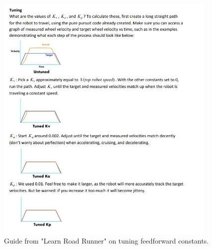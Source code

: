 \begin{figure}[htp]
\centering
\includegraphics[width=0.95\textwidth, angle=0]{Meetings/March/03-24-22/03-24-22 3.jpg}
\caption{Guide from "Learn Road Runner" on tuning feedforward constants.}
\label{fig:032422_3}
\end{figure}




